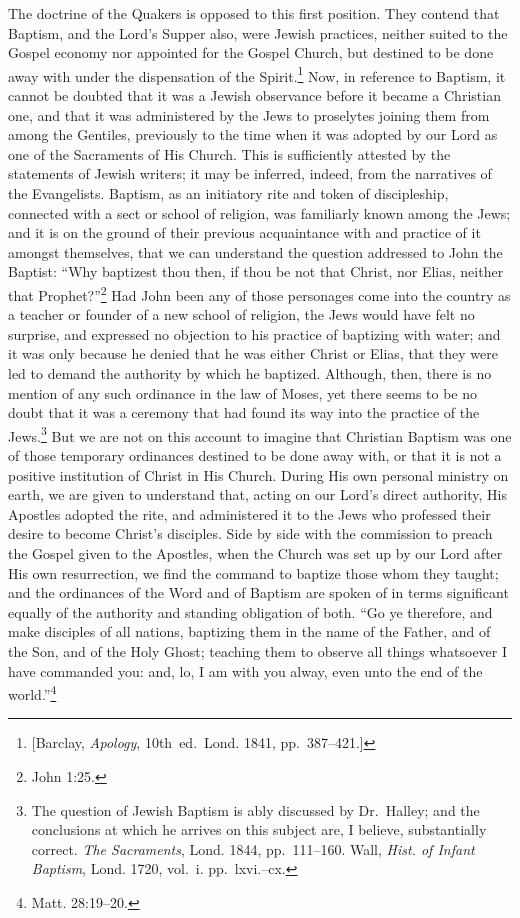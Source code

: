 \documentclass[
]{book}
\begin{document}
The doctrine of the Quakers is opposed to this first position. They contend that Baptism, and the Lord's Supper also, were Jewish practices, neither suited to the Gospel economy nor appointed for the Gospel Church, but destined to be done away with under the dispensation of the Spirit.\footnote{{[}Barclay, \emph{Apology}, 10th~ed.~Lond. 1841, pp.~387--421.{]}} Now, in reference to Baptism, it cannot be doubted that it was a Jewish observance before it became a Christian one, and that it was administered by the Jews to proselytes joining them from among the Gentiles, previously to the time when it was adopted by our Lord as one of the Sacraments of His Church. This is sufficiently attested by the statements of Jewish writers; it may be inferred, indeed, from the narratives of the Evangelists. Baptism, as an initiatory rite and token of discipleship, connected with a sect or school of religion, was familiarly known among the Jews; and it is on the ground of their previous acquaintance with and practice of it amongst themselves, that we can understand the question addressed to John the Baptist: ``Why baptizest thou then, if thou be not that Christ, nor Elias, neither that Prophet?''\footnote{John 1:25.} Had John been any of those personages come into the country as a teacher or founder of a new school of religion, the Jews would have felt no surprise, and expressed no objection to his practice of baptizing with water; and it was only because he denied that he was either Christ or Elias, that they were led to demand the authority by which he baptized. Although, then, there is no mention of any such ordinance in the law of Moses, yet there seems to be no doubt that it was a ceremony that had found its way into the practice of the Jews.\footnote{The question of Jewish Baptism is ably discussed by Dr.~Halley; and the conclusions at which he arrives on this subject are, I believe, substantially correct. \emph{The Sacraments}, Lond. 1844, pp.~111--160. Wall, \emph{Hist. of Infant Baptism}, Lond. 1720, vol.~i. pp.~lxvi.--cx.} But we are not on this account to imagine that Christian Baptism was one of those temporary ordinances destined to be done away with, or that it is not a positive institution of Christ in His Church. During His own personal ministry on earth, we are given to understand that, acting on our Lord's direct authority, His Apostles adopted the rite, and administered it to the Jews who professed their desire to become Christ's disciples. Side by side with the commission to preach the Gospel given to the Apostles, when the Church was set up by our Lord after His own resurrection, we find the command to baptize those whom they taught; and the ordinances of the Word and of Baptism are spoken of in terms significant equally of the authority and standing obligation of both. ``Go ye therefore, and make disciples of all nations, baptizing them in the name of the Father, and of the Son, and of the Holy Ghost; teaching them to observe all things whatsoever I have commanded you: and, lo, I am with you alway, even unto the end of the world.''\footnote{Matt. 28:19--20.}
\end{document}
